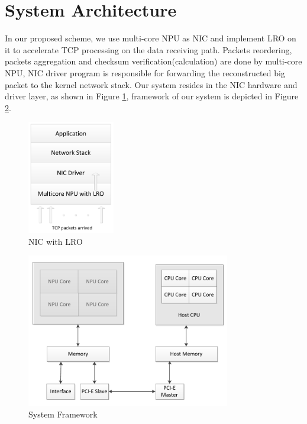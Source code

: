 \documentclass[conference]{IEEEtran}
\begin{document}
\section{System Architecture}
In our proposed scheme, we use multi-core NPU as NIC and implement LRO on it to accelerate TCP processing on the data receiving path. Packets reordering, packets aggregation and checksum verification(calculation) are done by multi-core NPU, NIC driver program is responsible for forwarding the reconstructed big packet to the kernel network stack. Our system resides in the NIC hardware and driver layer, as shown in Figure \ref{nic_with_lro}, framework of our system is depicted in Figure \ref{system framework}.
\begin{figure}[!t]
\centering
\includegraphics[width=1.5in]{nic_with_lro}
\caption{NIC with LRO}
\label{nic_with_lro}
\end{figure}
\begin{figure}[!t]
\centering
\includegraphics[width=3.5in]{system_framework}
\caption{System Framework}
\label{system framework}
\end{figure}
\end{document}
